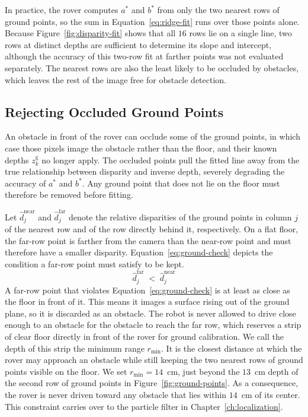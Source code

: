 In practice, the rover computes $a^{*}$ and $b^{*}$ from only the two nearest rows of ground
points, so the sum in Equation~\ref{eq:ridge-fit} runs over those points alone. Because Figure~\ref{fig:disparity-fit} shows that all $16$ rows lie on a single line, two
rows at distinct depths are sufficient to determine its slope and intercept, although the accuracy of this two-row fit at
farther points was not evaluated separately. The nearest rows are
also the least likely to be occluded by obstacles, which leaves the rest of the image free for
obstacle detection.

\subsection{Rejecting Occluded Ground Points}
\label{sec:ground-filter}

An obstacle in front of the rover can occlude some of the ground points, in which case those
pixels image the obstacle rather than the floor, and their known depths $z^{\mathrm{g}}_k$ no
longer apply. 
The occluded points pull the fitted line away from the true relationship between disparity and
inverse depth, severely degrading the accuracy of $a^{*}$ and $b^{*}$. Any ground point that does
not lie on the floor must therefore be removed before fitting.

Let $\hat{d}^{\mathrm{near}}_j$ and
$\hat{d}^{\mathrm{far}}_j$ denote the relative disparities of the ground points in column $j$ of
the nearest row and of the row directly behind it, respectively. On a flat floor, the far-row point
is farther from the camera than the near-row point and must therefore have a smaller disparity.
Equation~\ref{eq:ground-check} depicts the condition a far-row point must satisfy to be kept.
\begin{equation}
  \hat{d}^{\mathrm{far}}_j \;<\; \hat{d}^{\mathrm{near}}_j
  \label{eq:ground-check}
\end{equation}
A far-row point that violates Equation~\ref{eq:ground-check} is at least as close as the floor in
front of it. This means it images a surface rising out of the ground plane, so it is discarded as
an obstacle. The robot is never allowed to drive close
enough to an obstacle for the obstacle to reach the far row, which reserves a strip of clear floor
directly in front of the rover for ground calibration. We call the depth of this strip the minimum
range $r_{\min}$. It is the closest distance at which the rover may approach an obstacle while
still keeping the two nearest rows of ground points visible on the floor. We set
$r_{\min} = 14$~cm, just beyond the $13$~cm depth of the second row of ground points in
Figure~\ref{fig:ground-points}. As a consequence, the rover is never driven toward any obstacle
that lies within $14$~cm of its center. This constraint carries over to the particle filter in
Chapter~\ref{ch:localization}.

